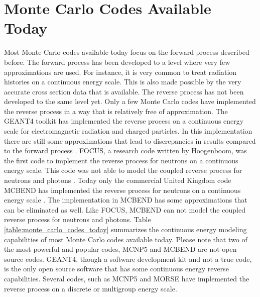 \documentclass[letterpaper,12pt]{article}
\begin{document}
\section{Monte Carlo Codes Available Today}
\label{sec:monte_carlo_codes}
Most Monte Carlo codes available today focus on the forward process described
before. The forward process has been developed to a level where very few 
approximations are used. For instance, it is very common to treat radiation
histories on a continuous energy scale. This is also made possible by the very
accurate cross section data that is available. The reverse process has not been 
developed to the same level yet. Only a few Monte Carlo codes have implemented
the reverse process in a way that is relatively free of approximation. The
GEANT4 toolkit has implemented the reverse process on a continuous energy 
scale for electromagnetic radiation and charged particles. In this implementation there are still some approximations that lead to discrepancies in results 
compared to the forward process \cite{desorgher_implementation_2010}. 
FOCUS, a research code written by 
Hoogenboom, was the first code to implement the reverse process for neutrons
on a continuous energy scale. This code was not able to model the coupled 
reverse process for neutrons and photons \cite{hoogenboom_adjoint_1977}. Today 
only the commercial United Kingdom code MCBEND has implemented the reverse
process for neutrons on a continuous energy scale 
\cite{grimstone_extension_1998}. The implementation in
MCBEND has some approximations that can be eliminated as well. Like FOCUS, 
MCBEND can not model the coupled reverse process for neutrons and photons. 
Table \ref{table:monte_carlo_codes_today} summarizes the continuous energy 
modeling capabilities of most Monte Carlo codes available today. Please note 
that two of the most powerful and popular codes, MCNP5 and MCBEND are not open 
source codes. GEANT4, though a software development kit and not a true code,
is the only open source software that has some continuous energy reverse 
capabilities. Several codes, such as MCNP5 and MORSE have implemented the 
reverse process on a discrete or multigroup energy scale.
\end{document}

